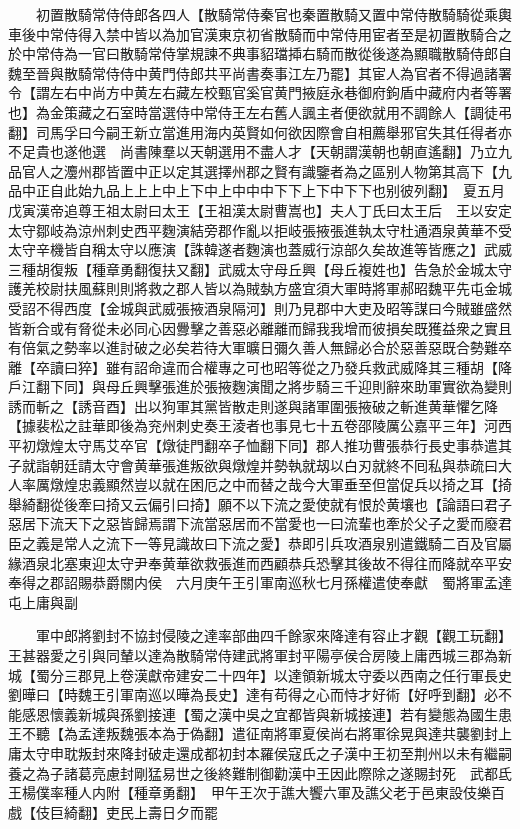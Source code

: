 　　初置散騎常侍侍郎各四人【散騎常侍秦官也秦置散騎又置中常侍散騎騎從乘輿車後中常侍得入禁中皆以為加官漢東京初省散騎而中常侍用宦者至是初置散騎合之於中常侍為一官曰散騎常侍掌規諫不典事貂璫揷右騎而散從後遂為顯職散騎侍郎自魏至晉與散騎常侍侍中黄門侍郎共平尚書奏事江左乃罷】其宦人為官者不得過諸署令【謂左右中尚方中黄左右藏左校甄官奚官黄門掖庭永巷御府鉤盾中藏府内者等署也】為金策藏之石室時當選侍中常侍王左右舊人諷主者便欲就用不調餘人【調徒弔翻】司馬孚曰今嗣王新立當進用海内英賢如何欲因際會自相薦舉邪官失其任得者亦不足貴也遂他選　尚書陳羣以天朝選用不盡人才【天朝謂漢朝也朝直遙翻】乃立九品官人之灋州郡皆置中正以定其選擇州郡之賢有識鑒者為之區别人物第其高下【九品中正自此始九品上上上中上下中上中中中下下上下中下下也别彼列翻】　夏五月戊寅漢帝追尊王祖太尉曰太王【王祖漢太尉曹嵩也】夫人丁氏曰太王后　王以安定太守鄒岐為涼州刺史西平麴演結旁郡作亂以拒岐張掖張進執太守杜通酒泉黄華不受太守辛機皆自稱太守以應演【誅韓遂者麴演也蓋威行涼部久矣故進等皆應之】武威三種胡復叛【種章勇翻復扶又翻】武威太守母丘興【母丘複姓也】告急於金城太守護羌校尉扶風蘇則則將救之郡人皆以為賊埶方盛宜須大軍時將軍郝昭魏平先屯金城受詔不得西度【金城與武威張掖酒泉隔河】則乃見郡中大吏及昭等謀曰今賊雖盛然皆新合或有脅從未必同心因釁擊之善惡必離離而歸我我增而彼損矣既獲益衆之實且有倍氣之勢率以進討破之必矣若待大軍曠日彌久善人無歸必合於惡善惡既合勢難卒離【卒讀曰猝】雖有詔命違而合權專之可也昭等從之乃發兵救武威降其三種胡【降戶江翻下同】與母丘興擊張進於張掖麴演聞之將步騎三千迎則辭來助軍實欲為變則誘而斬之【誘音酉】出以狗軍其黨皆散走則遂與諸軍圍張掖破之斬進黄華懼乞降【據裴松之註華即後為兖州刺史奏王淩者也事見七十五卷邵陵厲公嘉平三年】河西平初燉煌太守馬艾卒官【燉徒門翻卒子恤翻下同】郡人推功曹張恭行長史事恭遣其子就詣朝廷請太守會黄華張進叛欲與燉煌并勢執就刼以白刃就終不囘私與恭疏曰大人率厲燉煌忠義顯然豈以就在困厄之中而替之哉今大軍垂至但當促兵以掎之耳【掎舉綺翻從後牽曰掎又云偏引曰掎】願不以下流之愛使就有恨於黄壤也【論語曰君子惡居下流天下之惡皆歸焉謂下流當惡居而不當愛也一曰流輩也牽於父子之愛而廢君臣之義是常人之流下一等見識故曰下流之愛】恭即引兵攻酒泉别遣鐵騎二百及官屬緣酒泉北塞東迎太守尹奉黄華欲救張進而西顧恭兵恐擊其後故不得往而降就卒平安奉得之郡詔賜恭爵關内侯　六月庚午王引軍南巡秋七月孫權遣使奉獻　蜀將軍孟達屯上庸與副

　　軍中郎將劉封不協封侵陵之達率部曲四千餘家來降達有容止才觀【觀工玩翻】王甚器愛之引與同輦以達為散騎常侍建武將軍封平陽亭侯合房陵上庸西城三郡為新城【蜀分三郡見上卷漢獻帝建安二十四年】以達領新城太守委以西南之任行軍長史劉曄曰【時魏王引軍南巡以曄為長史】達有苟得之心而恃才好術【好呼到翻】必不能感恩懷義新城與孫劉接連【蜀之漢中吳之宜都皆與新城接連】若有變態為國生患王不聽【為孟達叛魏張本為于偽翻】遣征南將軍夏侯尚右將軍徐晃與達共襲劉封上庸太守申耽叛封來降封破走還成都初封本羅侯寇氏之子漢中王初至荆州以未有繼嗣養之為子諸葛亮慮封剛猛易世之後終難制御勸漢中王因此際除之遂賜封死　武都氐王楊僕率種人内附【種章勇翻】　甲午王次于譙大饗六軍及譙父老于邑東設伎樂百戲【伎巨綺翻】吏民上壽日夕而罷

